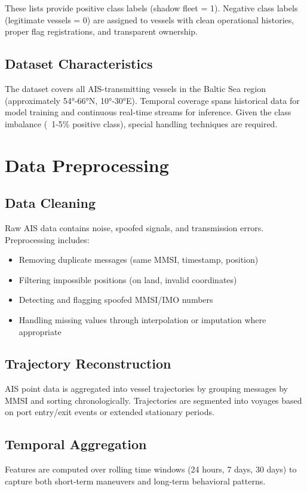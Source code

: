 These lists provide positive class labels (shadow fleet = 1). Negative class labels (legitimate vessels = 0) are assigned to vessels with clean operational histories, proper flag registrations, and transparent ownership.

\subsection{Dataset Characteristics}
The dataset covers all AIS-transmitting vessels in the Baltic Sea region (approximately 54°-66°N, 10°-30°E). Temporal coverage spans historical data for model training and continuous real-time streams for inference. Given the class imbalance (~1-5\% positive class), special handling techniques are required.

\section{Data Preprocessing}

\subsection{Data Cleaning}
Raw AIS data contains noise, spoofed signals, and transmission errors. Preprocessing includes:
\begin{itemize}
    \item Removing duplicate messages (same MMSI, timestamp, position)
    \item Filtering impossible positions (on land, invalid coordinates)
    \item Detecting and flagging spoofed MMSI/IMO numbers
    \item Handling missing values through interpolation or imputation where appropriate
\end{itemize}

\subsection{Trajectory Reconstruction}
AIS point data is aggregated into vessel trajectories by grouping messages by MMSI and sorting chronologically. Trajectories are segmented into voyages based on port entry/exit events or extended stationary periods.

\subsection{Temporal Aggregation}
Features are computed over rolling time windows (24 hours, 7 days, 30 days) to capture both short-term maneuvers and long-term behavioral patterns.

